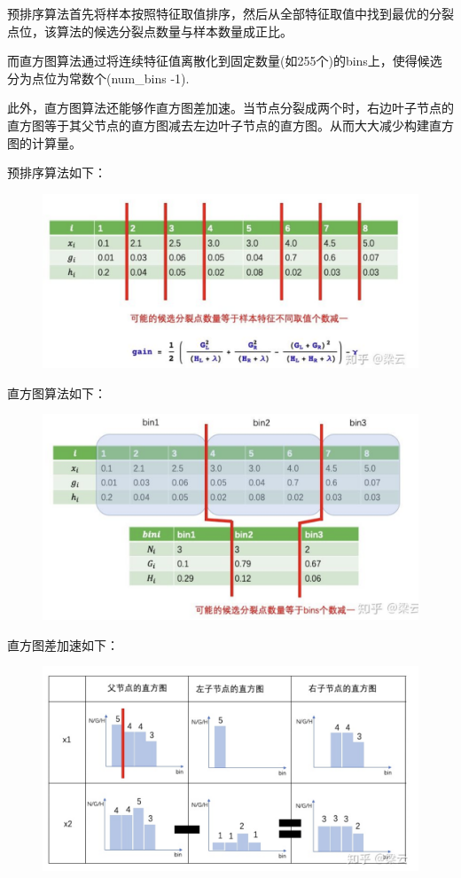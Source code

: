 \documentclass[12pt]{article}
\begin{document}
预排序算法首先将样本按照特征取值排序，然后从全部特征取值中找到最优的分裂点位，该算法的候选分裂点数量与样本数量成正比。

而直方图算法通过将连续特征值离散化到固定数量(如255个)的bins上，使得候选分为点位为常数个(num\_bins -1).

此外，直方图算法还能够作直方图差加速。当节点分裂成两个时，右边叶子节点的直方图等于其父节点的直方图减去左边叶子节点的直方图。从而大大减少构建直方图的计算量。

预排序算法如下：
\begin{figure}[H]
    \centering
    \includegraphics[width=1\textwidth]{fig/LightGBM_PreOrder_Example.png}
\end{figure}

直方图算法如下：
\begin{figure}[H]
    \centering
    \includegraphics[width=1\textwidth]{fig/LightGBM_Histogram_Example.png}
\end{figure}

直方图差加速如下：
\begin{figure}[H]
    \centering
    \includegraphics[width=1\textwidth]{fig/LightGBM_Histogram_Diff_Example.png}
\end{figure}
\end{document}
